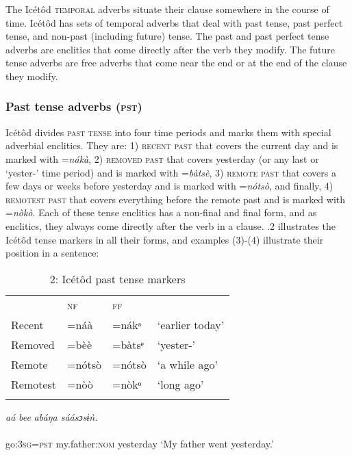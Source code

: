 The Icétôd \textsc{temporal} adverbs situate their clause somewhere in the course of time. Icétôd has sets of temporal adverbs that deal with past tense, past perfect tense, and non-past (including future) tense. The past and past perfect tense adverbs are enclitics that come directly after the verb they modify. The future tense adverbs are free adverbs that come near the end or at the end of the clause they modify. 


\subsubsection{Past tense adverbs (\textsc{pst})}

Icétôd divides \textsc{past tense} into four time periods and marks them with special adverbial enclitics. They are: 1) \textsc{recent past} that covers the current day and is marked with =\textit{nákà}, 2) \textsc{removed past} that covers yesterday (or any last or ‘yester-’ time period) and is marked with =\textit{bàtsè}, 3) \textsc{remote past} that covers a few days or weeks before yesterday and is marked with =\textit{nótsò}, and finally, 4) \textsc{remotest past} that covers everything before the remote past and is marked with =\textit{nòkò}. Each of these tense enclitics has a non-final and final form, and as enclitics, they always come directly after the verb in a clause. .2 illustrates the Icétôd tense markers in all their forms, and examples (3)-(4) illustrate their position in a sentence:


\begin{table}
\caption{2: Icétôd past tense markers}
\label{tab:9}


\begin{tabularx}{\textwidth}{XXXX} & \textsc{nf} & \textsc{ff} & \\
\lsptoprule
Recent & =náà & =nákᵃ & ‘earlier today’\\
Removed & =bèè & =bàtsᵉ & ‘yester-’\\
Remote & =nótsò & =nótsò & ‘a while ago’\\
Remotest & =nòò & =nòkᵒ & ‘long ago’\\
\lspbottomrule
\end{tabularx}
\end{table}



\ea\label{ex:}
\textit{aá} \textit{bee}\textit{   abáŋa     sáásɔsɨǹ.} \\
    \\
go:\textsc{3sg}=\textsc{pst}   my.father:\textsc{nom}   yesterday
\glt ‘My father went yesterday.’ 
\z




